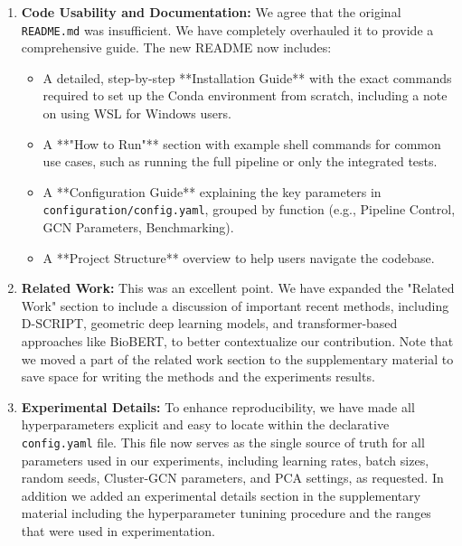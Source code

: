 \documentclass[11pt, a4paper]{article}
\begin{document}
	\begin{enumerate}[label=\arabic*., leftmargin=*]
		\item \textbf{Code Usability and Documentation:} We agree that the original \texttt{README.md} was insufficient. We have completely overhauled it to provide a comprehensive guide. The new README now includes:
		\begin{itemize}
			\item A detailed, step-by-step **Installation Guide** with the exact commands required to set up the Conda environment from scratch, including a note on using WSL for Windows users.
			\item A **"How to Run"** section with example shell commands for common use cases, such as running the full pipeline or only the integrated tests.
			\item A **Configuration Guide** explaining the key parameters in \texttt{configuration/config.yaml}, grouped by function (e.g., Pipeline Control, GCN Parameters, Benchmarking).
			\item A **Project Structure** overview to help users navigate the codebase.
		\end{itemize}
		
		\item \textbf{Related Work:} This was an excellent point. We have expanded the "Related Work" section to include a discussion of important recent methods, including D-SCRIPT, geometric deep learning models, and transformer-based approaches like BioBERT, to better contextualize our contribution. Note that we moved a part of the related work section to the supplementary material to save space for writing the methods and the experiments results.
		
		\item \textbf{Experimental Details:} To enhance reproducibility, we have made all hyperparameters explicit and easy to locate within the declarative \texttt{config.yaml} file. This file now serves as the single source of truth for all parameters used in our experiments, including learning rates, batch sizes, random seeds, Cluster-GCN parameters, and PCA settings, as requested. In addition we added an experimental details section in the supplementary material including the hyperparameter tunining procedure and the ranges that were used in experimentation.
	\end{enumerate}
	
	\clearpage
	
\end{document}
